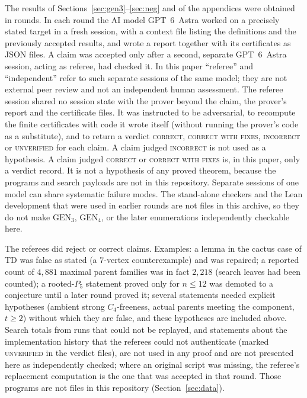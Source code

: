 \documentclass[11pt]{amsart}
\theoremstyle{definition}
\theoremstyle{remark}
\newcommand{\GEN}{\mathrm{GEN}}
\begin{document}
The results of Sections~\ref{sec:gen3}--\ref{sec:neg} and of the appendices were obtained in rounds. In each round the AI model GPT~6~Astra worked on a precisely stated target in a fresh session, with a context file listing the definitions and the previously accepted results, and wrote a report together with its certificates as JSON files. A claim was accepted only after a second, separate GPT~6~Astra session, acting as referee, had checked it. In this paper ``referee'' and ``independent'' refer to such separate sessions of the same model; they are not external peer review and not an independent human assessment. The referee session shared no session state with the prover beyond the claim, the prover's report and the certificate files. It was instructed to be adversarial, to recompute the finite certificates with code it wrote itself (without running the prover's code as a substitute), and to return a verdict \textsc{correct}, \textsc{correct with fixes}, \textsc{incorrect} or \textsc{unverified} for each claim. A claim judged \textsc{incorrect} is not used as a hypothesis. A claim judged \textsc{correct} or \textsc{correct with fixes} is, in this paper, only a verdict record. It is not a hypothesis of any proved theorem, because the programs and search payloads are not in this repository. Separate sessions of one model can share systematic failure modes. The stand-alone checkers and the Lean development that were used in earlier rounds are not files in this archive, so they do not make $\GEN_3$, $\GEN_4$, or the later enumerations independently checkable here.

The referees did reject or correct claims. Examples: a lemma in the cactus case of TD was false as stated (a $7$-vertex counterexample) and was repaired; a reported count of $4{,}881$ maximal parent families was in fact $2{,}218$ (search leaves had been counted); a rooted-$P_5$ statement proved only for $n\le12$ was demoted to a conjecture until a later round proved it; several statements needed explicit hypotheses (ambient strong $C_4$-freeness, actual parents meeting the component, $t\ge2$) without which they are false, and these hypotheses are included above. Search totals from runs that could not be replayed, and statements about the implementation history that the referees could not authenticate (marked \textsc{unverified} in the verdict files), are not used in any proof and are not presented here as independently checked; where an original script was missing, the referee's replacement computation is the one that was accepted in that round. Those programs are not files in this repository (Section~\ref{sec:data}).
\end{document}
